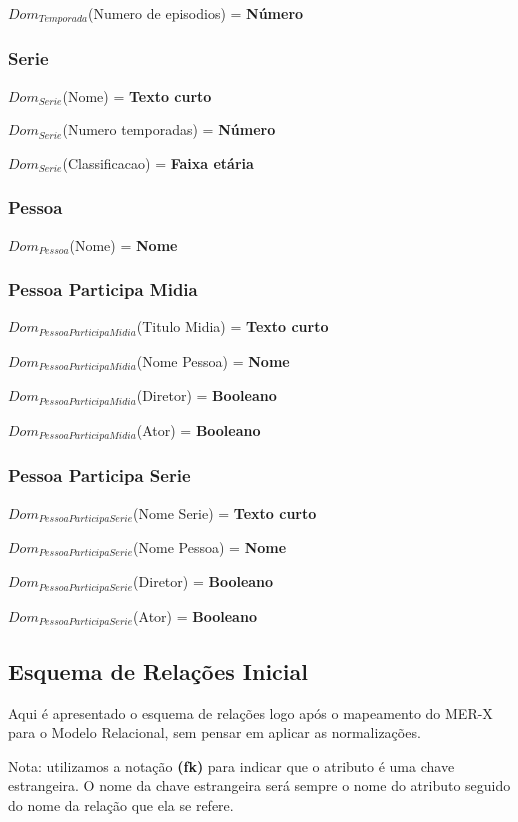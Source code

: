 \documentclass[12pt,a4paper]{article}
\newcommand{\createdomain}[3]{
    $Dom_{#1}$(#2) = {\bf #3}
}
\begin{document}
        \createdomain{Temporada}{Numero de episodios}{Número}


    \subsubsection{Serie}
        \createdomain{Serie}{Nome}{Texto curto}

        \createdomain{Serie}{Numero temporadas}{Número}

        \createdomain{Serie}{Classificacao}{Faixa etária}


    \subsubsection{Pessoa}
        \createdomain{Pessoa}{Nome}{Nome}


    \subsubsection{Pessoa Participa Midia}
        \createdomain{Pessoa Participa Midia}{Titulo Midia}{Texto curto}

        \createdomain{Pessoa Participa Midia}{Nome Pessoa}{Nome}

        \createdomain{Pessoa Participa Midia}{Diretor}{Booleano}

        \createdomain{Pessoa Participa Midia}{Ator}{Booleano}


    \subsubsection{Pessoa Participa Serie}
        \createdomain{Pessoa Participa Serie}{Nome Serie}{Texto curto}

        \createdomain{Pessoa Participa Serie}{Nome Pessoa}{Nome}

        \createdomain{Pessoa Participa Serie}{Diretor}{Booleano}

        \createdomain{Pessoa Participa Serie}{Ator}{Booleano}

\subsection{Esquema de Relações Inicial}
    
    Aqui é apresentado o esquema de relações logo após o mapeamento do MER-X para o Modelo Relacional, sem pensar em aplicar as normalizações.
    
    Nota: utilizamos a notação {\bf (fk)} para indicar que o atributo é uma chave estrangeira. O nome da chave estrangeira será sempre o nome do atributo seguido do nome da relação que ela se refere.
    
\end{document}
